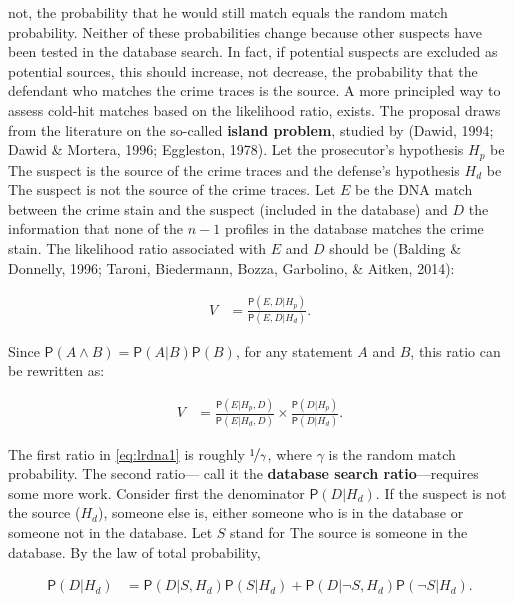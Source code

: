 \documentclass[10pt,dvipsnames,enabledeprecatedfontcommands]{scrartcl}
\newcommand{\pr}[1]{\mathsf{P}(#1)}
\begin{document}
not, the probability that he would still match equals the random match
probability. Neither of these probabilities change because other
suspects have been tested in the database search. In fact, if potential
suspects are excluded as potential sources, this should increase, not
decrease, the probability that the defendant who matches the crime
traces is the source. A more principled way to assess cold-hit matches
based on the likelihood ratio, exists. The proposal draws from the
literature on the so-called \textbf{island problem}, studied by (Dawid,
1994; Dawid \& Mortera, 1996; Eggleston, 1978). Let the prosecutor's
hypothesis \(H_p\) be
\textsf{The suspect is the source of the crime traces} and the defense's
hypothesis \(H_d\) be
\textsf{The suspect is not the source of the crime traces}. Let \(E\) be
the DNA match between the crime stain and the suspect (included in the
database) and \(D\) the information that none of the \(n-1\) profiles in
the database matches the crime stain. The likelihood ratio associated
with \(E\) and \(D\) should be (Balding \& Donnelly, 1996; Taroni,
Biedermann, Bozza, Garbolino, \& Aitken, 2014):

\begin{align*}
V & = \frac{\pr{E,D\vert H_p}}{\pr{E,D\vert H_d}}.
\end{align*}

Since \(\pr{A\wedge B}=\pr{A\vert B}\pr{B}\), for any statement \(A\)
and \(B\), this ratio can be rewritten as:

\begin{align}\label{eq:lrdna1}
V & = \frac{\pr{E\vert H_p,D}}{\pr{E\vert H_d,D}} \times \frac{\pr{D\vert H_p}}{\pr{D\vert H_d}}.
\end{align}

\noindent The first ratio in \eqref{eq:lrdna1} is roughly
\(\nicefrac{1}{\gamma}\), where \(\gamma\) is the random match
probability. The second ratio--- call it the
\textbf{database search ratio}---requires some more work. Consider first
the denominator \(\pr{D \vert H_d}\). If the suspect is not the source
(\(H_d\)), someone else is, either someone who is in the database or
someone not in the database. Let \(S\) stand for
\textsf{The  source is someone in the database.} By the law of total
probability,

\begin{align}\label{eq:dnaLOTP}
\pr{D\vert H_d} & = \pr{D\vert S, H_d} \pr{S\vert H_d} + \pr{D\vert \neg S, H_d} \pr{\neg S \vert H_d}. 
\end{align}
\end{document}
